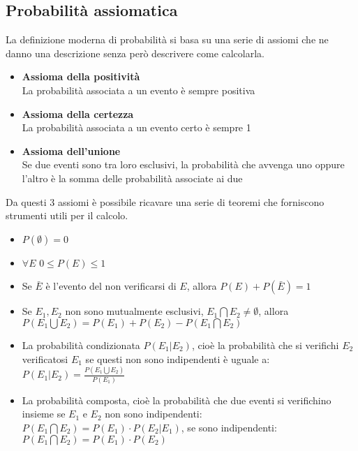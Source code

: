 \documentclass{article}
\begin{document}
\subsection{Probabilità assiomatica}
La definizione moderna di probabilità si basa su una serie di assiomi che ne danno una descrizione senza però descrivere come calcolarla.
\begin{itemize}
    \item \textbf{Assioma della positività}\\
    La probabilità associata a un evento è sempre positiva
    \item \textbf{Assioma della certezza}\\
    La probabilità associata a un evento certo è sempre 1
    \item \textbf{Assioma dell'unione}\\
    Se due eventi sono tra loro esclusivi, la probabilità che avvenga uno oppure l'altro è la somma delle probabilità associate ai due
\end{itemize}
Da questi 3 assiomi è possibile ricavare una serie di teoremi che forniscono strumenti utili per il calcolo.
\begin{itemize}
    \item $P(\emptyset)=0$
    \item $\forall E$ $0 \leq P(E) \leq 1$
    \item Se $\bar{E}$ è l'evento del non verificarsi di $E$, allora $P(E) + P(\bar{E}) = 1$
    \item Se $E_1, E_2$ non sono mutualmente esclusivi, $E_1 \bigcap E_2 \neq \emptyset$, allora $P(E_1 \bigcup E_2)=P(E_1)+P(E_2)-P(E_1 \bigcap E_2)$
    \item La probabilità condizionata $P(E_1|E_2)$, cioè la probabilità che si verifichi $E_2$ verificatosi $E_1$ se questi non sono indipendenti è uguale a: $P(E_1|E_2)=\frac{P(E_1 \bigcup E_2)}{P(E_1)}$
    \item La probabilità composta, cioè la probabilità che due eventi si verifichino insieme se $E_1$ e $E_2$ non sono indipendenti: $P(E_1 \bigcap E_2)=P(E_1) \cdot P(E_2|E_1)$, se sono indipendenti: $P(E_1 \bigcap E_2) =P(E_1) \cdot P(E_2)$
\end{itemize}



\newpage
\renewcommand*\contentsname{Indice}
\tableofcontents
\end{document}
